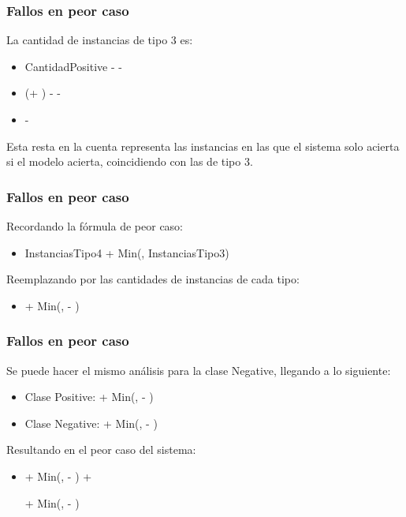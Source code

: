 \begin{frame}[t]
\frametitle{Fallos en peor caso}
\vspace{6mm}
La cantidad de instancias de tipo 3 es:
\vspace{3mm}
\begin{itemize}
\item CantidadPositive - \IPFN - \INTP
\item (\IPTP + \IPFN) - \IPFN - \INTP 
\item \IPTP - \INTP
\end{itemize}
\vspace{3mm}
Esta resta en la cuenta representa las instancias en las que el sistema solo acierta si el modelo acierta, coincidiendo con las de tipo 3.
\end{frame}



\begin{frame}[t]
\frametitle{Fallos en peor caso}
\vspace{6mm}
Recordando la f\'ormula de peor caso:
\vspace{3mm}
\begin{itemize}
    \item InstanciasTipo4 + Min(\MFN, InstanciasTipo3)
\end{itemize}
\vspace{3mm}
Reemplazando por las cantidades de instancias de cada tipo:
\vspace{3mm}
\begin{itemize}
    \item \IPFN + Min(\MFN, \IPTP - \INTP)
\end{itemize}
\end{frame}



\begin{frame}[t]
\frametitle{Fallos en peor caso}
\vspace{6mm}
Se puede hacer el mismo an\'alisis para la clase Negative, llegando a lo siguiente:
\vspace{3mm}
\begin{itemize}
    \item Clase Positive: \IPFN + Min(\MFN, \IPTP - \INTP)
    \item Clase Negative: \INFP + Min(\MFP, \INTN - \IPTN)
\end{itemize}
\vspace{3mm}
Resultando en el peor caso del sistema:
\vspace{3mm}
\begin{itemize}
    \item {\IPFN + Min(\MFN, \IPTP - \INTP) +

    \INFP + Min(\MFP, \INTN - \IPTN)}
\end{itemize}
\end{frame}